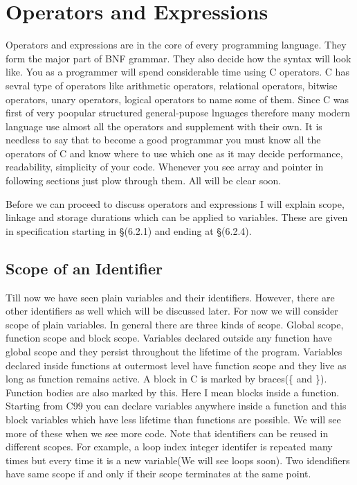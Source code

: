 \chapter{Operators and Expressions}
Operators and expressions are in the core of every programming language. They
form the major part of BNF grammar. They also decide how the syntax will look
like. You as a programmer will spend considerable time using C operators. C has
sevral type of operators like arithmetic operators, relational operators,
bitwise operators, unary operators, logical operators to name some of them.
Since C was first of very poopular structured general-pupose lnguages therefore
many modern language use almost all the operators and supplement with their own.
It is needless to say that to become a good programmar you must know all the
operators of C and know where to use which one as it may decide performance,
readability, simplicity of your code. Whenever you see array and pointer in
following sections just plow through them. All will be clear soon.

Before we can proceed to discuss operators and expressions I will explain
scope, linkage and storage durations which can be applied to
variables. These are given in specification starting in \S(6.2.1) and ending at
\S(6.2.4).

\section{Scope of an Identifier}
Till now we have seen plain variables and their identifiers. However, there are
other identifiers as well which will be discussed later. For now we will
consider scope of plain variables. In general there are three kinds of
scope. Global scope, function scope and block scope. Variables declared outside
any function have global scope and they persist throughout the lifetime of the
program. Variables declared inside functions at outermost level have function
scope and they live as long as function remains active. A block in C is marked
by braces(\{ and \}). Function bodies are also marked by this. Here I mean
blocks inside a function. Starting from C99 you can declare variables anywhere
inside a function and this block variables which have less lifetime than
functions are possible. We will see more of these when we see more code. Note
that identifiers can be reused in different scopes. For example, a loop index
integer identifer is repeated many times but every time it is a new
variable(We will see loops soon). Two idendifiers have same scope if and only
if their scope terminates at the same point.

